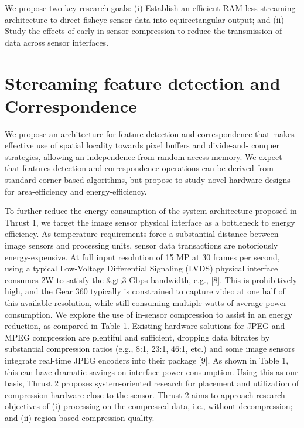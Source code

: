 We propose two key research goals: (i) Establish an efficient RAM-less streaming
architecture to direct fisheye sensor data into equirectangular output; and (ii) Study the effects
of early in-sensor compression to reduce the transmission of data across sensor interfaces.  \newline

\section{Stereaming feature detection and Correspondence}

We propose an architecture for feature detection and correspondence that makes effective use of spatial locality towards pixel buffers and divide-and- conquer strategies, allowing an independence from random-access memory. We expect that features detection and correspondence operations can be derived from standard corner-based algorithms, but propose to study novel hardware designs for area-efficiency and energy-efficiency. \newline

To further reduce the energy consumption of the system architecture proposed in Thrust 1, we target the image sensor physical interface as a bottleneck to energy efficiency. As temperature requirements force a substantial distance between image sensors and processing units, sensor data transactions are notoriously energy-expensive. At full input resolution of 15 MP at 30 frames per second, using a typical Low-Voltage Differential Signaling (LVDS) physical interface consumes 2W to satisfy the \&gt;3 Gbps bandwidth, e.g., [8]. This is prohibitively high, and the Gear 360 typically is constrained to capture video at one half of this available resolution, while still consuming multiple watts of average power consumption. We explore the use of in-sensor compression to assist in an energy reduction, as compared in Table 1. Existing hardware solutions for JPEG and MPEG compression are plentiful and sufficient, dropping data \newline
bitrates by substantial compression ratios (e.g., 8:1, 23:1, 46:1, etc.) and some image sensors integrate real-time JPEG encoders into their package [9]. As shown in Table 1, this can have dramatic savings on interface power consumption. Using this as our basis, Thrust 2 proposes system-oriented research for placement and utilization of compression hardware close to the sensor. Thrust 2 aims to approach research objectives of (i) processing on the compressed data, i.e., without decompression; and (ii) region-based compression quality.\newline
----------------------------------------------------


